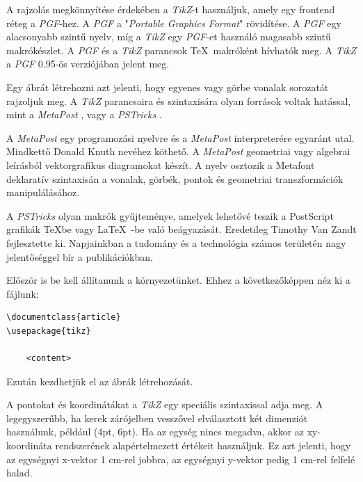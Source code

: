 

A rajzolás megkönnyítése érdekében a \textit{TikZ}-t \cite{tikzmanual}\cite{tikzmanual2} használjuk, amely egy frontend réteg a \textit{PGF}-hez. A \textit{PGF} a "\textit{Portable Graphics Format}" rövidítése. A \textit{PGF} egy alacsonyabb szintű nyelv, míg a \textit{TikZ} egy \textit{PGF}-et használó magasabb szintű makrókészlet. A \textit{PGF} és a \textit{TikZ} parancsok \TeX\ makróként hívhatók meg. A \textit{TikZ} a \textit{PGF} 0.95-ös verziójában jelent meg.

Egy ábrát létrehozni azt jelenti, hogy egyenes vagy görbe vonalak sorozatát rajzoljuk meg. A \textit{TikZ} parancsaira és szintaxisára olyan források voltak hatással, mint a \textit{MetaPost} \cite{metapost}, vagy a \textit{PSTricks} \cite{pstricks}.

A \textit{MetaPost} egy programozási nyelvre és a \textit{MetaPost} interpreterére egyaránt utal. Mindkettő Donald Knuth nevéhez köthető. A \textit{MetaPost} geometriai vagy algebrai leírásból vektorgrafikus diagramokat készít. A nyelv osztozik a Metafont deklaratív szintaxisán a vonalak, görbék, pontok és geometriai transzformációk manipulálásához.

A \textit{PSTricks} olyan makrók gyűjteménye, amelyek lehetővé teszik a PostScript grafikák \TeX\-be vagy \LaTeX\ -be való beágyazását. Eredetileg Timothy Van Zandt fejlesztette ki. Napjainkban a tudomány és a technológia számos területén nagy jelentőséggel bír a publikációkban. 



Először is be kell állítanunk a környezetünket. Ehhez a következőképpen néz ki a fájlunk:

\begin{lstlisting}[style=latex]
\documentclass{article}
\usepackage{tikz}

    <content>

\end{lstlisting}

\noindent
Ezután kezdhetjük el az ábrák létrehozását. 



A pontokat és koordinátákat a \textit{TikZ} egy speciális szintaxissal adja meg. A legegyszerűbb, ha kerek zárójelben vesszővel elválasztott két dimenziót használunk, például (4pt, 6pt). Ha az egység nincs megadva, akkor az xy-koordináta rendszerének alapértelmezett értékeit használjuk. Ez azt jelenti, hogy az egységnyi x-vektor 1 cm-rel jobbra, az egységnyi y-vektor pedig 1 cm-rel felfelé halad. 

